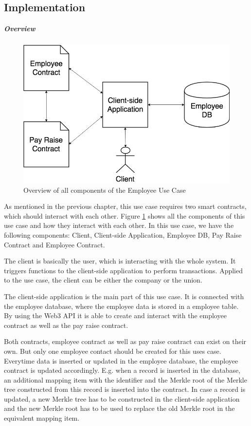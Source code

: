 \subsection{Implementation}
\subparagraph{Overview}

\begin{figure}[h]%
	\centering
	\includegraphics[width=1.0\textwidth]{images/payraiseusecase.png}
	\caption{\label{fig:payraiseusecase}Overview of all components of the Employee Use Case}
\end{figure}

As mentioned in the previous chapter, this use case requires two smart contracts, which should interact with each other. Figure \ref{fig:payraiseusecase} shows all the components of this use case and how they interact with each other. In this use case, we have the following components: Client, Client-side Application, Employee DB, Pay Raise Contract and Employee Contract.

The client is basically the user, which is interacting with the whole system. It triggers functions to the client-side application to perform transactions. Applied to the use case, the client can be either the company or the union.

The client-side application is the main part of this use case. It is connected with the employee database, where the employee data is stored in a employee table. By using the Web3 API it is able to create and interact with the employee contract as well as the pay raise contract.

Both contracts, employee contract as well as pay raise contract can exist on their own. But only one employee contact should be created for this uses case. Everytime data is inserted or updated in the employee database, the employee contract is updated accordingly. E.g. when a record is inserted in the database, an additional mapping item with the identifier and the Merkle root of the Merkle tree constructed from this record is inserted into the contract. In case a record is updated, a new Merkle tree has to be constructed in the client-side application and the new Merkle root has to be used to replace the old Merkle root in the equivalent mapping item.

